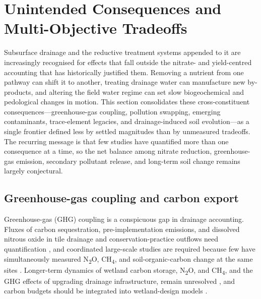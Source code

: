 \section{Unintended Consequences and Multi-Objective Tradeoffs}

Subsurface drainage and the reductive treatment systems appended to it are
increasingly recognised for effects that fall outside the nitrate- and
yield-centred accounting that has historically justified them. Removing a
nutrient from one pathway can shift it to another, treating drainage water can
manufacture new by-products, and altering the field water regime can set slow
biogeochemical and pedological changes in motion. This section consolidates
these cross-constituent consequences---greenhouse-gas coupling, pollution
swapping, emerging contaminants, trace-element legacies, and drainage-induced
soil evolution---as a single frontier defined less by settled magnitudes than
by unmeasured tradeoffs. The recurring message is that few studies have
quantified more than one consequence at a time, so the net balance among
nitrate reduction, greenhouse-gas emission, secondary pollutant release, and
long-term soil change remains largely conjectural.

\subsection{Greenhouse-gas coupling and carbon export}

Greenhouse-gas (GHG) coupling is a conspicuous gap in drainage accounting.
Fluxes of carbon sequestration, pre-implementation emissions, and dissolved
nitrous oxide in tile drainage and conservation-practice outflows need
quantification \parencite{Mitchell2023}, and coordinated large-scale studies
are required because few have simultaneously measured N\textsubscript{2}O,
CH\textsubscript{4}, and soil-organic-carbon change at the same sites
\parencite{Hall2025}. Longer-term dynamics of wetland carbon storage,
N\textsubscript{2}O, and CH\textsubscript{4}, and the GHG effects of upgrading
drainage infrastructure, remain unresolved \parencite{Mitchell2022}, and carbon
budgets should be integrated into wetland-design models \parencite{Kadlec2012}.

